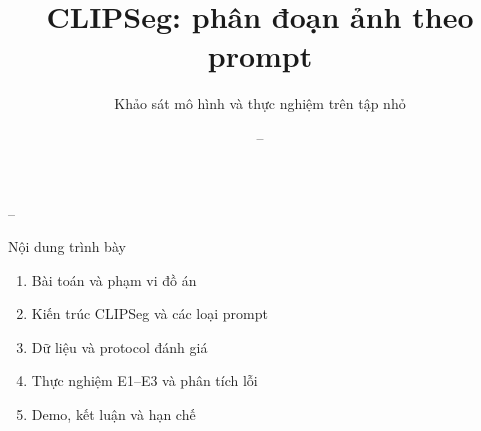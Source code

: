 

\title[CLIPSeg]{CLIPSeg: phân đoạn ảnh theo prompt}
\subtitle{Khảo sát mô hình và thực nghiệm trên tập nhỏ}
\author[\studentone]{\studentone{} -- \studentoneid}
\date{}

\newcommand{\figureplaceholder}[2][0.45\textheight]{%
  \fbox{\parbox[c][#1][c]{0.86\linewidth}{\centering\small #2}}%
}


\begin{frame}[plain]
\centering
\vspace{0.7cm}
\vspace{0.45cm}
{\large \studentone{} -- \studentoneid\par}
\vspace{0.2cm}
{\normalsize \coursename\par}
\vspace{0.15cm}
{\normalsize \reportdate\par}
\end{frame}

\begin{frame}{Nội dung trình bày}
\begin{enumerate}
\item Bài toán và phạm vi đồ án
\item Kiến trúc CLIPSeg và các loại prompt
\item Dữ liệu và protocol đánh giá
\item Thực nghiệm E1--E3 và phân tích lỗi
\item Demo, kết luận và hạn chế
\end{enumerate}
\end{frame}

